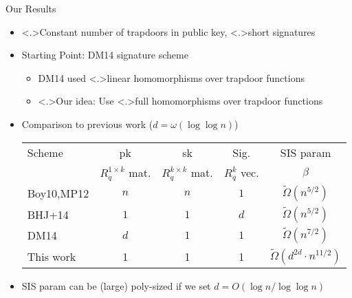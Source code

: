 \documentclass[shadow,xcolor=pdftex,svgnames,table,t]{beamer}
\begin{document}
\begin{frame}[label=results]{Our Results}
\begin{itemize}
\item<+-> \alert<.>{Constant} number of trapdoors in public key, \alert<.>{short
  signatures}
\medskip
\item<+-> Starting Point: DM14 signature scheme
\smallskip
\begin{itemize}
\item<+-> DM14 used \alert<.>{linear homomorphisms} over trapdoor functions
\smallskip
\item<+-> \alert<.>{Our idea: }Use \alert<.>{full homomorphisms} over
  trapdoor functions
\smallskip

\end{itemize}
\item<+-> Comparison to previous work ($d=\omega(\log{\log{n}})$)
\smallskip
\begin{table}
\begin{tabular}{|l|cccc|}
\hline
Scheme&pk &sk &Sig. &SIS param \\
&$R_q^{1 \times k}$ mat.&$R_q^{k \times k}$ mat.&$R_q^{k}$
vec.&$\beta$\\
\hline
Boy10,MP12&$n$&$n$&$1$&$\tilde{\Omega}(n^{5/2})$\\
BHJ+14&$1$&$1$&$d$&$\tilde{\Omega}(n^{5/2})$\\
DM14&$d$&$1$&$1$&$\tilde{\Omega}(n^{7/2})$\\
\hline
This work&1&1&1&$\tilde{\Omega}(d^{2d}\cdot
n^{11/2})$\\
\hline
\end{tabular}
\end{table}
\smallskip
\item<+-> SIS param can be (large) poly-sized if we set $d=O(\log{n}/\log{\log{n}})$
\end{itemize}
\end{frame}
\end{document}
